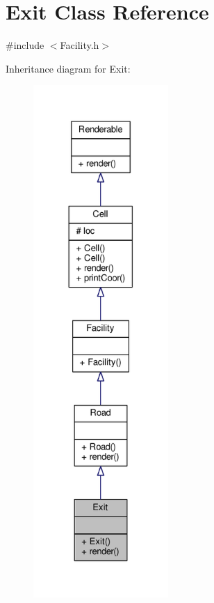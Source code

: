 \hypertarget{classExit}{}\section{Exit Class Reference}
\label{classExit}


{\ttfamily \#include $<$Facility.\+h$>$}



Inheritance diagram for Exit\+:
\nopagebreak
\begin{figure}[H]
\begin{center}
\leavevmode
\includegraphics[height=550pt]{classExit__inherit__graph}
\end{center}
\end{figure}



